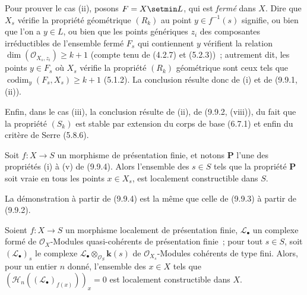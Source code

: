 Pour prouver le cas (ii), posons $F=X\setmin L$, qui est \emph{fermé} dans $X$. Dire
que $X_s$
vérifie la propriété géométrique $(R_k)$ au point $y\in f^{-1}(s)$ signifie, ou
bien que l'on a $y\in L$, ou bien que les points génériques $z_i$ des
composantes irréductibles de l'ensemble fermé $F_s$ qui contiennent $y$
vérifient la relation $\dim(\mathcal O_{X_s,z_i})\geq k+1$ (compte tenu de
(4.2.7) et (5.2.3))~; autrement dit, les points $y\in F_s$ où $X_s$ vérifie la
propriété $(R_k)$ géométrique sont ceux tels que
$\operatorname{codim}_y(F_s,X_s)\geq k+1$ (5.1.2). La conclusion résulte donc
de (i) et de (9.9.1, (ii)).

Enfin, dans le cas (iii), la conclusion résulte de (ii), de (9.9.2, (viii)), du
fait que la propriété $(S_k)$ est stable par extension du corps de base (6.7.1)
et enfin du critère de Serre (5.8.6).

\begin{corollary}[9.9.5]
\label{IV.9.9.5-fr}
Soit $f:X\to S$ un morphisme de présentation finie, et notons $\boldsymbol{P}$
l'une des propriétés \textup{(i)} à \textup{(v)} de \textup{(9.9.4)}. Alors l'ensemble des $s\in S$ tels
que la propriété $\boldsymbol{P}$ soit vraie en tous les points $x\in X_s$, est
localement constructible dans $S$.
\end{corollary}

La démonstration à partir de (9.9.4) est la même que celle de (9.9.3) à partir
de (9.9.2).

\begin{proposition}[9.9.6]
\label{IV.9.9.6-fr}
Soient $f:X\to S$ un morphisme localement de présentation finie,
$\mathcal L_\bullet$ un complexe formé de $\mathcal O_X$-Modules
quasi-cohérents de présentation finie~; pour tout $s\in S$, soit
$(\mathcal L_\bullet)_s$ le complexe
$\mathcal L_\bullet\otimes_{\mathcal O_S}\boldsymbol{k}(s)$ de
$\mathcal O_{X_s}$-Modules cohérents de type fini. Alors, pour un entier $n$
donné, l'ensemble des $x\in X$ tels que
$(\mathcal H_n((\mathcal L_\bullet)_{f(x)}))_x=0$ est localement constructible
dans $X$.
\end{proposition}


